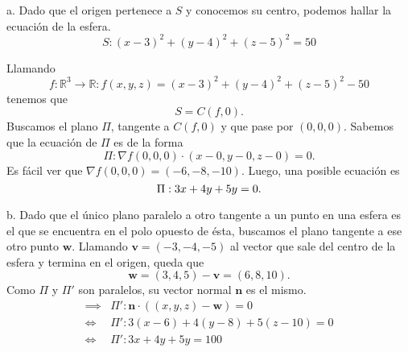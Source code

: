 
\begin{solution}
    a. Dado que el origen pertenece a $S$ y conocemos su centro, podemos hallar la ecuación de la esfera.
    \[
    S:(x-3)^2 + (y-4)^2 + (z-5)^2 = 50
    \]
    \begin{center}
    \end{center}
    
  Llamando $$f:\mathbb{R}^3 \rightarrow \mathbb{R}:  f(x,y,z) = (x-3)^2 + (y-4)^2 + (z-5)^2 - 50$$
 tenemos que $$S=C(f,0). $$ 
 Buscamos el plano $\Pi$, tangente a $C(f,0)$ y que pase por $(0,0,0)$. Sabemos que la ecuación de  $\Pi$  es  de la forma
    \[
    \Pi:\nabla f(0,0,0) \cdot (x-0,y-0,z-0) = 0.
    \]
  Es f\'acil ver que $\nabla f(0,0,0) = (-6,-8,-10).$  Luego, una posible ecuaci\'on es
    \[\\[1pt]
     \Pi: 3x + 4y + 5y = 0.
    \]

        b. Dado que el único plano paralelo a otro tangente a un punto en una esfera es el que se encuentra en el polo opuesto de ésta, buscamos el plano tangente a ese otro punto $\mathbf{w}$. Llamando $\mathbf{v} = (-3,-4,-5)$ al vector que sale del centro de la esfera y termina en el origen, queda que
        \[
        \mathbf{w} = (3,4,5) - \mathbf{v} = (6,8,10).
        \]
        Como $\Pi$ y $\Pi'$ son paralelos, su vector normal $\textbf{n}$ es el mismo.
        \[
        \begin{aligned}
        \implies & \Pi ': \textbf{n} \cdot ((x,y,z) - \mathbf{w}) = 0\\
        \iff & \Pi ': 3(x-6) + 4(y-8) + 5(z-10) = 0 \\
        \iff & \Pi ':3x + 4y + 5y = 100
        \end{aligned}
        \]


\end{solution}
